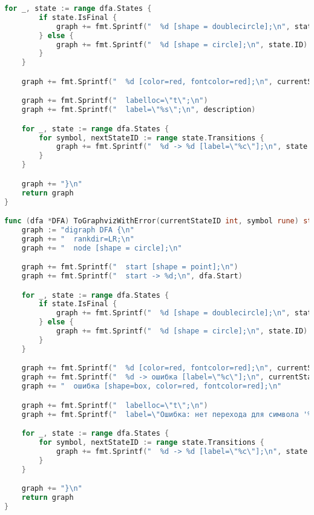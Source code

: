 \begin{lstlisting}[language=Go, caption={Код модуля \textit{dfa}}]
	for _, state := range dfa.States {
		if state.IsFinal {
			graph += fmt.Sprintf("  %d [shape = doublecircle];\n", state.ID)
		} else {
			graph += fmt.Sprintf("  %d [shape = circle];\n", state.ID)
		}
	}

	graph += fmt.Sprintf("  %d [color=red, fontcolor=red];\n", currentStateID)

	graph += fmt.Sprintf("  labelloc=\"t\";\n")
	graph += fmt.Sprintf("  label=\"%s\";\n", description)

	for _, state := range dfa.States {
		for symbol, nextStateID := range state.Transitions {
			graph += fmt.Sprintf("  %d -> %d [label=\"%c\"];\n", state.ID, nextStateID, symbol)
		}
	}

	graph += "}\n"
	return graph
}

func (dfa *DFA) ToGraphvizWithError(currentStateID int, symbol rune) string {
	graph := "digraph DFA {\n"
	graph += "  rankdir=LR;\n"
	graph += "  node [shape = circle];\n"

	graph += fmt.Sprintf("  start [shape = point];\n")
	graph += fmt.Sprintf("  start -> %d;\n", dfa.Start)

	for _, state := range dfa.States {
		if state.IsFinal {
			graph += fmt.Sprintf("  %d [shape = doublecircle];\n", state.ID)
		} else {
			graph += fmt.Sprintf("  %d [shape = circle];\n", state.ID)
		}
	}

	graph += fmt.Sprintf("  %d [color=red, fontcolor=red];\n", currentStateID)
	graph += fmt.Sprintf("  %d -> ошибка [label=\"%c\"];\n", currentStateID, symbol)
	graph += "  ошибка [shape=box, color=red, fontcolor=red];\n"

	graph += fmt.Sprintf("  labelloc=\"t\";\n")
	graph += fmt.Sprintf("  label=\"Ошибка: нет перехода для символа '%c'\";\n", symbol)

	for _, state := range dfa.States {
		for symbol, nextStateID := range state.Transitions {
			graph += fmt.Sprintf("  %d -> %d [label=\"%c\"];\n", state.ID, nextStateID, symbol)
		}
	}

	graph += "}\n"
	return graph
}
\end{lstlisting}

